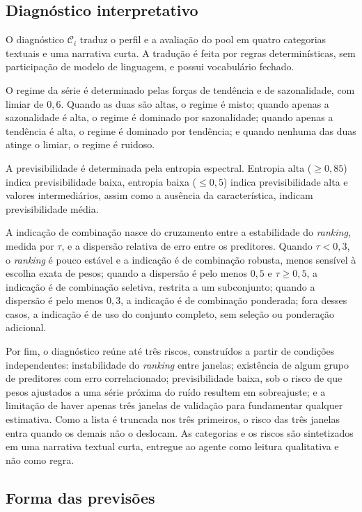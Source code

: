 \subsection{Diagnóstico interpretativo}

O diagnóstico $\mathcal{C}_i$ traduz o perfil e a avaliação do pool em quatro categorias textuais e uma narrativa curta. A tradução é feita por regras determinísticas, sem participação de modelo de linguagem, e possui vocabulário fechado.

O regime da série é determinado pelas forças de tendência e de sazonalidade, com limiar de $0{,}6$. Quando as duas são altas, o regime é misto; quando apenas a sazonalidade é alta, o regime é dominado por sazonalidade; quando apenas a tendência é alta, o regime é dominado por tendência; e quando nenhuma das duas atinge o limiar, o regime é ruidoso.

A previsibilidade é determinada pela entropia espectral. Entropia alta ($\geq 0{,}85$) indica previsibilidade baixa, entropia baixa ($\leq 0{,}5$) indica previsibilidade alta e valores intermediários, assim como a ausência da característica, indicam previsibilidade média.

A indicação de combinação nasce do cruzamento entre a estabilidade do \textit{ranking}, medida por $\tau$, e a dispersão relativa de erro entre os preditores. Quando $\tau<0{,}3$, o \textit{ranking} é pouco estável e a indicação é de combinação robusta, menos sensível à escolha exata de pesos; quando a dispersão é pelo menos $0{,}5$ e $\tau\geq0{,}5$, a indicação é de combinação seletiva, restrita a um subconjunto; quando a dispersão é pelo menos $0{,}3$, a indicação é de combinação ponderada; fora desses casos, a indicação é de uso do conjunto completo, sem seleção ou ponderação adicional.

Por fim, o diagnóstico reúne até três riscos, construídos a partir de condições independentes: instabilidade do \textit{ranking} entre janelas; existência de algum grupo de preditores com erro correlacionado; previsibilidade baixa, sob o risco de que pesos ajustados a uma série próxima do ruído resultem em sobreajuste; e a limitação de haver apenas três janelas de validação para fundamentar qualquer estimativa. Como a lista é truncada nos três primeiros, o risco das três janelas entra quando os demais não o deslocam. As categorias e os riscos são sintetizados em uma narrativa textual curta, entregue ao agente como leitura qualitativa e não como regra.

\subsection{Forma das previsões}

